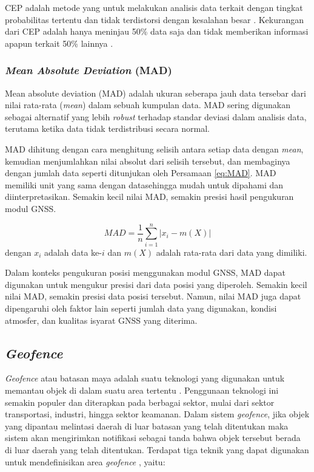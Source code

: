 CEP adalah metode yang untuk melakukan analisis data terkait dengan tingkat probabilitas tertentu dan tidak terdistorsi dengan kesalahan besar \cite{Chin1983}. Kekurangan dari CEP adalah hanya meninjau 50\% data saja dan tidak memberikan informasi apapun terkait 50\% lainnya \cite{Sathish2016}.

\subsubsection{\textit{Mean Absolute Deviation} (MAD)}
Mean absolute deviation (MAD) adalah ukuran seberapa jauh data tersebar dari nilai rata-rata (\textit{mean}) dalam sebuah kumpulan data. MAD sering digunakan sebagai alternatif yang lebih \textit{robust} terhadap standar deviasi dalam analisis data, terutama ketika data tidak terdistribusi secara normal.

MAD dihitung dengan cara menghitung selisih antara setiap data dengan \textit{mean}, kemudian menjumlahkan nilai absolut dari selisih tersebut, dan membaginya dengan jumlah data seperti ditunjukan oleh Persamaan \ref{eq:MAD}. MAD memiliki unit yang sama dengan datasehingga mudah untuk dipahami dan diinterpretasikan. Semakin kecil nilai MAD, semakin presisi hasil pengukuran modul GNSS.

\begin{equation}
	MAD = \frac{1}{n} \sum_{i=1}^{n} \left| x_i - m(X) \right|
	\label{eq:MAD}
\end{equation}
dengan $x_i$ adalah data ke-$i$ dan $m(X)$ adalah rata-rata dari data yang dimiliki.

Dalam konteks pengukuran posisi menggunakan modul GNSS, MAD dapat digunakan untuk mengukur presisi dari data posisi yang diperoleh. Semakin kecil nilai MAD, semakin presisi data posisi tersebut. Namun, nilai MAD juga dapat dipengaruhi oleh faktor lain seperti jumlah data yang digunakan, kondisi atmosfer, dan kualitas isyarat GNSS yang diterima.

\subsection{\textit{Geofence}}
\textit{Geofence} atau batasan maya adalah suatu teknologi yang digunakan untuk memantau objek di dalam suatu area tertentu \cite{Sari2021}. Penggunaan teknologi ini semakin populer dan diterapkan pada berbagai sektor, mulai dari sektor transportasi, industri, hingga sektor keamanan. Dalam sistem \textit{geofence}, jika objek yang dipantau melintasi daerah di luar batasan yang telah ditentukan maka sistem akan mengirimkan notifikasi sebagai tanda bahwa objek tersebut berada di luar daerah yang telah ditentukan. Terdapat tiga teknik yang dapat digunakan untuk mendefinisikan area \textit{geofence} \cite{Rui2015}, yaitu:

